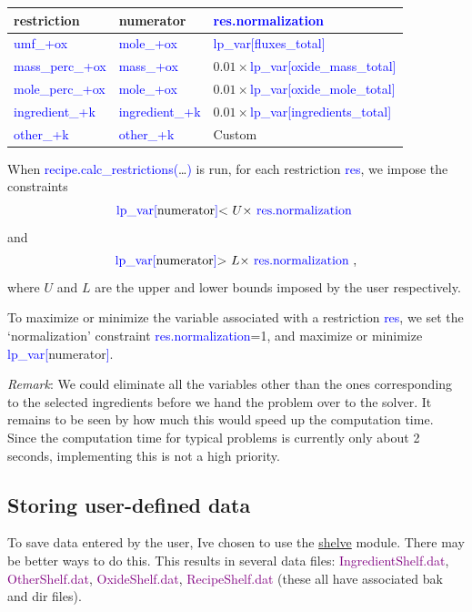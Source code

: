 \documentclass[a4paper,10pt]{article}
\def\'{\textquotesingle}
\def\tq{\textquotesingle}
\def\blue{\textcolor{blue}}
\def\green{\textcolor{Purple}}
\def\lpv{lp\_var}
\begin{document}
\begin{flushleft}
\begin{tabular}{|p{}|p{}| p{}| } \hline
 restriction                   & numerator                     & \blue{res.normalization} \\ \hline
 \blue{\tq umf\_\tq+ox}        & \blue{\tq mole\_\tq+ox} & \blue{\lpv[\tq fluxes\_total\tq]} \\ \hline
 \blue{\tq mass\_perc\_\tq+ox} & \blue{\tq mass\_\tq+ox} & $0.01\times$\blue{\lpv[\tq oxide\_mass\_total\tq]}  \\ \hline
 \blue{\tq mole\_perc\_\tq+ox} & \blue{\tq mole\_\tq+ox} & $0.01\times$\blue{\lpv[\tq oxide\_mole\_total\tq]}  \\ \hline
 \blue{\tq ingredient\_\tq+k}  & \blue{\tq ingredient\_\tq+k} & $0.01\times$\blue{\lpv[\tq ingredients\_total\tq]}  \\ \hline
 \blue{\tq other\_\tq+k}       & \blue{\tq other\_\tq+k} &  Custom \\ \hline
\end{tabular}
\end{flushleft}

When \blue{recipe.calc\_restrictions(}\ldots\blue{)} is run, for each restriction \blue{res}, we impose the constraints
$$\textnormal{\blue{\lpv[}numerator\blue{]}< $U\times$ \blue{res.normalization} }$$
and 
$$\textnormal{\blue{\lpv[}numerator\blue{]}> $L\times$ \blue{res.normalization} },$$
where $U$ and $L$ are the upper and lower bounds imposed by the user respectively.

To maximize or minimize the variable associated with a restriction \blue{res}, we set the `normalization' constraint \blue{res.normalization}=1, and maximize or minimize \blue{\lpv[}numerator\blue{]}. 

\emph{Remark}: We could eliminate all the variables other than the ones corresponding to the selected ingredients before we hand the problem over to the solver. It remains to be seen by how much this would speed up the computation time. Since the computation time for typical problems is currently only about 2 seconds, implementing this is not a high priority.

\subsection{Storing user-defined data}

To save data entered by the user, I\'ve chosen to use the \href{https://docs.python.org/3.6/library/shelve.html}{shelve} module. There may be better ways to do this. This results in several data files: \green{IngredientShelf.dat}, \green{OtherShelf.dat}, \green{OxideShelf.dat}, \green{RecipeShelf.dat} (these all have associated bak and dir files). 
\end{document}

